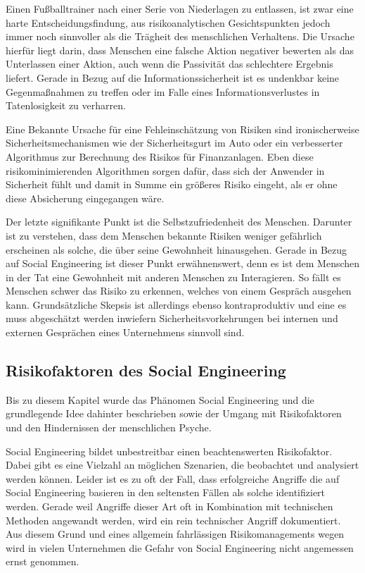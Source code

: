 Einen Fußballtrainer nach einer Serie von Niederlagen zu entlassen, ist zwar eine harte
Entscheidungsfindung, aus risikoanalytischen Gesichtspunkten jedoch immer noch sinnvoller als die
Trägheit des menschlichen Verhaltens.
Die Ursache hierfür liegt darin, dass Menschen eine falsche Aktion negativer bewerten als das
Unterlassen einer Aktion, auch wenn die Passivität das schlechtere Ergebnis liefert.
Gerade in Bezug auf die Informationssicherheit ist es undenkbar keine Gegenmaßnahmen zu treffen oder
im Falle eines Informationsverlustes in Tatenlosigkeit zu verharren.

Eine Bekannte Ursache für eine Fehleinschätzung von Risiken sind ironischerweise
Sicherheitsmechanismen wie der Sicherheitsgurt im Auto oder ein verbesserter Algorithmus zur
Berechnung des Risikos für Finanzanlagen.
Eben diese risikominimierenden Algorithmen sorgen dafür, dass sich der Anwender in Sicherheit fühlt
und damit in Summe ein größeres Risiko eingeht, als er ohne diese Absicherung eingegangen wäre.

Der letzte signifikante Punkt ist die Selbstzufriedenheit des Menschen. Darunter ist zu verstehen,
dass dem Menschen bekannte Risiken weniger gefährlich erscheinen als solche, die über seine Gewohnheit
hinausgehen.
Gerade in Bezug auf Social Engineering ist dieser Punkt erwähnenswert, denn es ist dem Menschen in der
Tat eine Gewohnheit mit anderen Menschen zu Interagieren.
So fällt es Menschen schwer das Risiko zu erkennen, welches von einem Gespräch ausgehen kann.
Grundsätzliche Skepsis ist allerdings ebenso kontraproduktiv und eine es muss abgeschätzt werden
inwiefern Sicherheitsvorkehrungen bei internen und externen Gesprächen eines Unternehmens sinnvoll
sind.
\citep{risikomanagement}

\subsection{Risikofaktoren des Social Engineering}\label{sec:social_engineering_als_risikofaktor}
Bis zu diesem Kapitel wurde das Phänomen Social Engineering und die grundlegende Idee dahinter
beschrieben sowie der Umgang mit Risikofaktoren und den Hindernissen der menschlichen Psyche.

Social Engineering bildet unbestreitbar einen beachtenswerten Risikofaktor.
Dabei gibt es eine Vielzahl an möglichen Szenarien, die beobachtet und analysiert werden können.
Leider ist es zu oft der Fall, dass erfolgreiche Angriffe die auf Social Engineering basieren in den
seltensten Fällen als solche identifiziert werden.
Gerade weil Angriffe dieser Art oft in Kombination mit technischen Methoden angewandt werden, wird ein
rein technischer Angriff dokumentiert.
Aus diesem Grund und eines allgemein fahrlässigen Risikomanagements wegen wird in vielen Unternehmen
die Gefahr von Social Engineering nicht angemessen ernst genommen.

